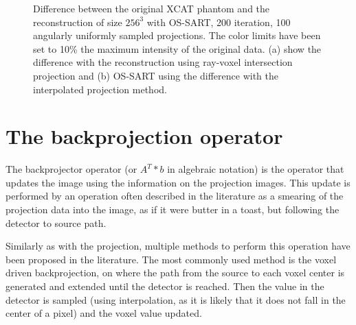 \begin{figure}
\centering
{}

\caption{\label{fig:OSSART200projdiff} Difference between the original XCAT phantom  and the reconstruction of size $256^3$ with OS-SART, 200 iteration, 100 angularly uniformly sampled projections. The color limits have been set to 10\% the maximum intensity of the original data.  (a) show the difference with the reconstruction using ray-voxel intersection projection and (b) OS-SART using the difference with the interpolated projection method.  } 
\end{figure}



\FloatBarrier

\section{The backprojection operator}

The backprojector operator (or $A^T*b$ in algebraic notation) is the operator that updates the image using the information on the projection images. This update is performed by an operation often described in the literature as a smearing of the projection data into the image, as if it were butter in a toast, but following the detector to source path.

 Similarly as with the projection, multiple methods to perform this operation have been proposed in the literature. The most commonly used method is the voxel driven backprojection\cite{scherl2007fast}\cite{okitsu2010high}, on where the path from the source to each voxel center is generated and extended until the detector is reached. Then the value in the detector is sampled (using interpolation, as it is likely that it does not fall in the center of a pixel) and the voxel value updated.
 

